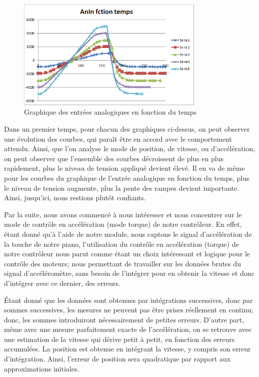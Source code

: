 \documentclass[french,a4paper,12pt]{report}
\begin{document}
{\begin{figure}[h]
\begin{minipage}[c]{.46\linewidth}
         \centering
         \includegraphics[width=9cm]{m1_AnIn.png}
         \caption{Graphique des entrées analogiques en fonction du temps}
     \end{minipage}
 	\end{figure}} 
		
	Dans un premier temps, pour chacun des graphiques ci-dessus, on peut observer une évolution des courbes, qui paraît être en accord avec le comportement attendu. Ainsi, que l'on analyse le mode de position, de vitesse, ou d'accélération, on peut observer que l'ensemble des courbes décroissent de plus en plus rapidement, plus le niveau de tension appliqué devient élevé. Il en va de même pour les courbes du graphique de l'entrée analogique en fonction du temps, plus le niveau de tension augmente, plus la pente des rampes devient importante. Ainsi, jusqu'ici, nous restions plutôt confiants.
	
	Par la suite, nous avons commencé à nous intéresser et nous concentrer sur le mode de contrôle en accélération (mode torque) de notre contrôleur. En effet, étant donné qu'à l'aide de notre module, nous captons le signal d'accélération de la touche de notre piano, l'utilisation du contrôle en accélération (torque) de notre contrôleur nous parut comme étant un choix intéressant et logique pour le contrôle des moteurs; nous permettant de travailler sur les données brutes du signal d'accéléromètre, 	sans besoin de l'intégrer pour en obtenir la vitesse et donc d'intégrer avec ce dernier, des erreurs.
	
	Étant donné que les données sont obtenues par intégrations successives, donc par sommes successives, les mesures ne peuvent pas être prises réellement en continu; donc, les sommes introduiront nécessairement de petites erreurs. D'autre part, même avec une mesure parfaitement exacte de l'accélération, on se retrouve avec une estimation de la vitesse qui dérive petit à petit, en fonction des erreurs accumulées. La position est obtenue en intégrant la vitesse, y compris son erreur d'intégration. Ainsi, l'erreur de position sera quadratique par rapport aux approximations initiales. 
	
\end{document}
